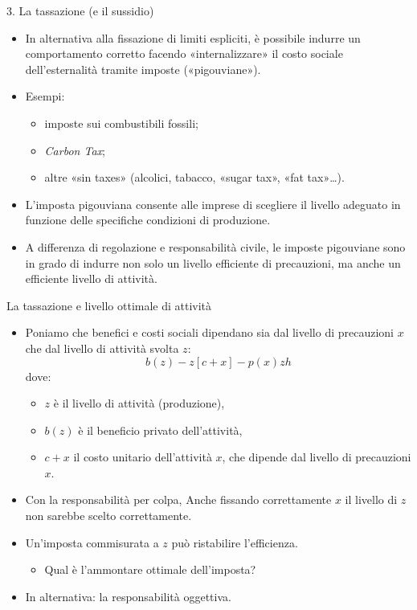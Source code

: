 \documentclass[aspectratio=64,12pt]{beamer}
\begin{document}
\begin{frame}{3. La tassazione (e il sussidio)}
\begin{itemize}
\item In alternativa alla fissazione di limiti espliciti, è possibile indurre un
comportamento corretto facendo «internalizzare» il costo sociale
dell'esternalità tramite imposte («pigouviane»).
\item Esempi:
\begin{itemize}
\item imposte sui combustibili fossili;
\item \emph{Carbon Tax};
\item altre «sin taxes» (alcolici, tabacco, «sugar tax», «fat tax»\ldots{}).
\end{itemize}
\item L'imposta pigouviana consente alle imprese di scegliere il livello adeguato
in funzione delle specifiche condizioni di produzione.
\item A differenza di regolazione e responsabilità civile, le imposte pigouviane
sono in grado di indurre non solo un livello efficiente di precauzioni, ma
anche un efficiente \alert{livello di attività}.
\end{itemize}
\end{frame}

\begin{frame}{La tassazione e livello ottimale di attività}
\begin{itemize}
\item Poniamo che benefici e costi sociali dipendano sia dal livello di
precauzioni $x$ che dal livello di attività svolta $z$:
\begin{equation*}
b(z) - z[c+x] - p(x)zh
\end{equation*}
dove:
\begin{itemize}
\item $z$ è il livello di attività (produzione),
\item $b(z)$ è il beneficio privato dell'attività,
\item $c + x$ il costo unitario dell’attività $x$, che dipende dal livello di
precauzioni $x$.
\end{itemize}
\item Con la responsabilità per colpa, Anche fissando correttamente $x$ il
  livello di $z$ non sarebbe scelto correttamente.
\item Un'imposta commisurata a $z$ può ristabilire l’efficienza.
\begin{itemize}
\item Qual è l’ammontare ottimale dell’imposta?
\end{itemize}
\item In alternativa: la responsabilità oggettiva.
\end{itemize}
\end{frame}
\end{document}
